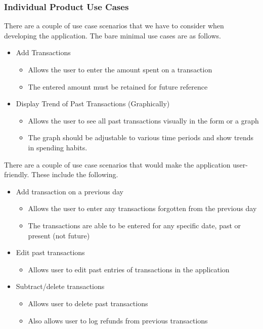 \documentclass[12pt, titlepage]{article}
\begin{document}
\subsubsection{Individual Product Use Cases}
There are a couple of use case scenarios that we have to consider when developing the application. The bare minimal use cases are as follows.
\begin{itemize}
   \item Add Transactions
   \begin{itemize}
     \item Allows the user to enter the amount spent on a transaction
     \item The entered amount must be retained for future reference
   \end{itemize}
   \item Display Trend of Past Transactions (Graphically)
   \begin{itemize}
     \item Allows the user to see all past transactions visually in the form or a graph
     \item The graph should be adjustable to various time periods and show trends in spending habits.
   \end{itemize}
\end{itemize}

There are a couple of use case scenarios that would make the application user-friendly. These include the following.
\begin{itemize}
   \item Add transaction on a previous day
   \begin{itemize}
     \item Allows the user to enter any transactions forgotten from the previous day
     \item The transactions are able to be entered for any specific date, past or present (not future)
   \end{itemize}
   \item Edit past transactions
   \begin{itemize}
     \item Allows user to edit past entries of transactions in the application
   \end{itemize}
   \item Subtract/delete transactions
   \begin{itemize}
     \item Allows user to delete past transactions
    \item Also allows user to log refunds from previous transactions
   \end{itemize}
\end{itemize}
\end{document}
